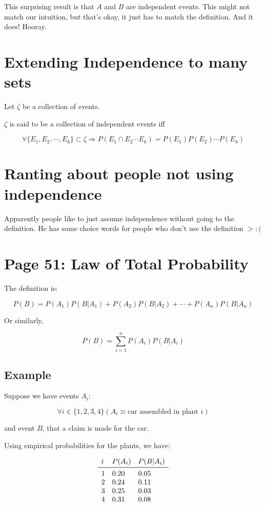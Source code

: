 \documentclass{article}
\begin{document}
This surprising result is that $A$ and $B$ are independent
events. This might not match our intuition, but that's okay, it just
has to match the definition. And it does! Hooray.

\section*{Extending Independence to many sets}

Let $\zeta$ be a collection of events.

$\zeta$ is said to be a collection of independent events iff

\[
\forall \{E_1,E_2,\cdots,E_k\}\subset\zeta\Rightarrow P(E_1\cap E_2\cdots E_k)=P(E_1)P(E_2)\cdots P(E_k)
\]

\section*{Ranting about people not using independence}

Apparently people like to just assume independence without going to
the definition. He has some choice words for people who don't use the
definition $>:($

\section*{Page 51: Law of Total Probability}

The definition is:

\[
P(B)=P(A_1)P(B|A_1) + P(A_2)P(B|A_2) + \cdots + P(A_n)P(B|A_n)
\]

Or similarly,

\[
P(B)=\sum\limits_{i=1}^n P(A_i)P(B|A_i)
\]

\subsection*{Example}

Suppose we have events $A_i$:

\[
\forall i\in\{1,2,3,4\}(A_i\equiv\text{car assembled in plant $i$})
\]

and event $B$, that a claim is made for the car.

Using empirical probabilities for the plants, we have:

\[
\begin{array}{lll}
i & P(A_i) & P(B|A_i) \\
\midrule
1 & 0.20 & 0.05\\
2 & 0.24 & 0.11 \\
3 & 0.25 & 0.03 \\
4 & 0.31 & 0.08
\end{array}
\]
\end{document}
